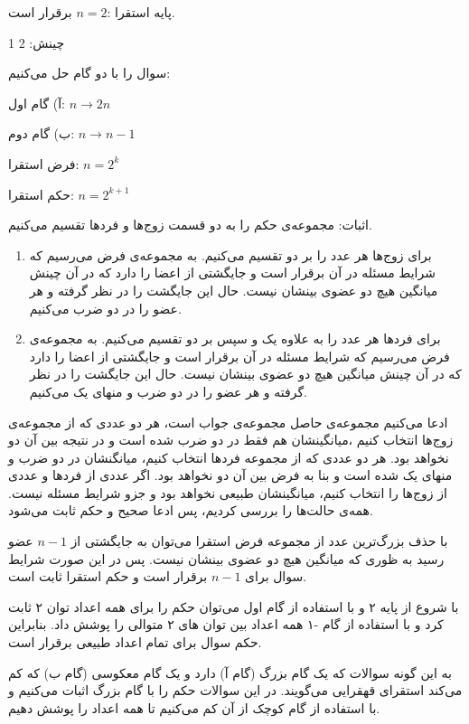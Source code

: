 \documentclass[11pt,largemargins]{h2wp}
\begin{document}
 
 
 پایه استقرا :$ n = 2 $  برقرار است.
 
 چینش: 2 1
 
 سوال را با دو گام حل می‌کنیم:
 
 آ) گام اول: $ n  \rightarrow  2n $
 
 ب) گام دوم: $ n \rightarrow n-1 $
 
 فرض استقرا: $ n = 2^k $ 
 
 حکم استقرا: $n = 2 ^ { k+1 } $ 
 
 
اثبات: مجموعه‌ی حکم را به دو قسمت زوج‌ها و فردها تقسیم می‌کنیم.
	\begin{enumerate}
		\item
برای زوج‌ها هر عدد را بر دو تقسیم می‌کنیم. به مجموعه‌ی فرض می‌رسیم که شرایط مسئله در آن برقرار است و جایگشتی از اعضا را دارد که در آن چینش میانگین هیچ دو عضوی بینشان نیست. حال این جایگشت را در نظر گرفته و هر عضو را در دو ضرب می‌کنیم.

 		\item

برای فردها هر عدد را به علاوه یک و سپس بر دو تقسیم می‌کنیم. به مجموعه‌ی فرض می‌رسیم که شرایط مسئله در آن برقرار است و جایگشتی از اعضا را دارد که در آن چینش میانگین هیچ دو عضوی بینشان نیست. حال
این جایگشت را در نظر گرفته و هر عضو را در دو ضرب  و منهای یک می‌کنیم.
 	\end{enumerate}
 	
 	
 	
ادعا می‌کنیم مجموعه‌ی حاصل مجموعه‌ی جواب است، هر دو عددی که از مجموعه‌ی زوج‌ها انتخاب کنیم ،میانگینشان هم فقط در دو ضرب شده است و در نتیجه بین آن دو نخواهد بود.
هر دو عددی که از مجموعه فردها انتخاب کنیم، میانگنشان در دو ضرب و منهای یک شده است و بنا به فرض بین آن دو نخواهد بود. اگر عددی از فردها و عددی از زوج‌ها را انتخاب کنیم، میانگینشان طبیعی نخواهد بود و جزو شرایط مسئله نیست.
همه‌ی حالت‌ها را بررسی کردیم، پس ادعا صحیح و حکم ثابت می‌شود.


با حذف بزرگ‌ترین عدد از مجموعه فرض استقرا می‌توان به جایگشتی از  $n-1 $ عضو رسید به ظوری که میانگین هیچ دو عضوی بینشان نیست. پس در این صورت شرایط سوال برای $n-1 $ برقرار است و حکم استقرا ثابت است. 


با شروع از پایه ۲ و با استفاده از گام اول می‌توان حکم را برای همه اعداد توان ۲ ثابت کرد و با استفاده از گام -۱ همه اعداد بین توان های ۲ متوالی را پوشش داد. بنابراین حکم سوال برای تمام اعداد طبیعی برقرار است. 



 \notes
 	
 	به این گونه سوالات که یک گام بزرگ (گام آ) دارد و یک گام معکوسی (گام ب) که کم می‌کند استقرای قهقرایی می‌گویند. در این سوالات حکم را با گام بزرگ اثبات می‌کنیم و با استفاده از گام کوچک از آن کم می‌کنیم تا همه اعداد را پوشش دهیم.
 	
\end{document}
